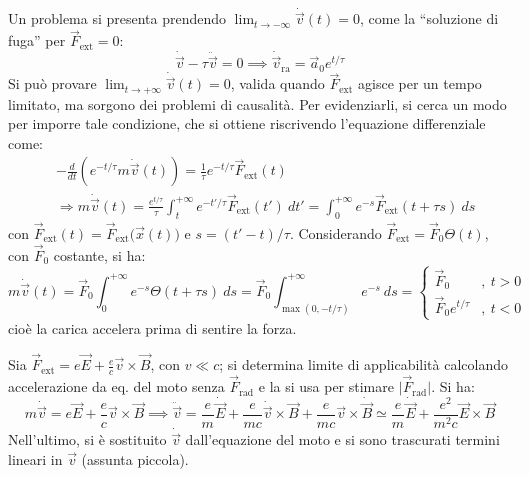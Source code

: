 \documentclass[10pt, a4paper]{scrartcl}
\numberwithin{equation}{subsection}
\theoremstyle{style1}
\begin{document}
Un problema si presenta prendendo $\displaystyle \lim_{t \to -\infty} \dot{\vec{v}}(t)=0 $, come la ``soluzione di fuga'' per $\vec{F}_\text{ext}=0$: 
\begin{equation}
	\dot{\vec{v}} - \tau \ddot{\vec{v}}=0\implies \dot{\vec{v}}_\text{ra} = \vec{a}_0 e^{ t / \tau } 
\end{equation}
Si pu\`o provare $\displaystyle \lim_{t \to +\infty} \dot{\vec{v}}(t)=0$, valida quando $\vec{F}_\text{ext}$ agisce per un tempo limitato, ma sorgono dei problemi di causalit\`a. Per evidenziarli, si cerca un modo per imporre tale condizione, che si ottiene riscrivendo l'equazione differenziale come:
\begin{equation}
	\begin{split}
		&-\frac{d }{d t} \left(e^{-t / \tau } m \dot{\vec{v}}(t)\right) = \frac{1}{\tau } e^{- t / \tau } \vec{F}_\text{ext}(t)\\
		&\Rightarrow m \dot{\vec{v}}(t) = \frac{e^{t / \tau } }{\tau } \int_{t} ^{+\infty} e^{-t' / \tau } \vec{F}_\text{ext}(t') \ dt' = \int_{0} ^{+\infty} e^{-s} \vec{F}_\text{ext}(t+\tau s) \ ds
	\end{split}
\end{equation}
con $\vec{F}_\text{ext}(t) = \vec{F}_\text{ext}\big(\vec{x}(t)\big)$ e $s = (t'-t) / \tau $. Considerando $\vec{F}_{\text{ext}} = \vec{F}_0 \Theta(t)$, con $\vec{F}_0$ costante, si ha:
\begin{equation}
	m\dot{\vec{v}}(t) = \vec{F}_0 \int_{0} ^{+\infty} e^{-s} \Theta (t+\tau s) \ ds = \vec{F}_0 \int_{\max(0,-t / \tau )}^{+\infty} e ^{-s}  \ ds= \begin{cases}
		\vec{F}_0&, \ t>0\\
		\vec{F}_0 e^{t / \tau } &,\ t<0
	\end{cases} 
\end{equation}
cio\`e la carica accelera prima di sentire la forza.

Sia $\vec{F}_\text{ext} = e\vec{E}+ \frac{e}{c}\vec{v}\times \vec{B}$, con $v \ll c$; si determina limite di applicabilit\`a calcolando accelerazione da eq. del moto senza $\vec{F}_\text{rad}$ e la si usa per stimare $\lvert \vec{F}_\text{rad} \rvert $. Si ha:
\begin{equation}
	m\dot{\vec{v}} = e \vec{E} + \frac{e}{c}\vec{v}\times \vec{B} \implies \ddot{\vec{v}} = \frac{e}{m} \dot{\vec{E}}+ \frac{e}{mc}\dot{\vec{v}}\times \vec{B}+ \frac{e}{mc}\vec{v}\times \dot{\vec{B}}\simeq \frac{e}{m}\dot{\vec{E}}+\frac{e^2 }{m^2 c}\vec{E}\times \vec{B}
\end{equation}
Nell'ultimo, si \`e sostituito $\dot{\vec{v}}$ dall'equazione del moto e si sono trascurati termini lineari in $\vec{v}$ (assunta piccola).
\end{document}
